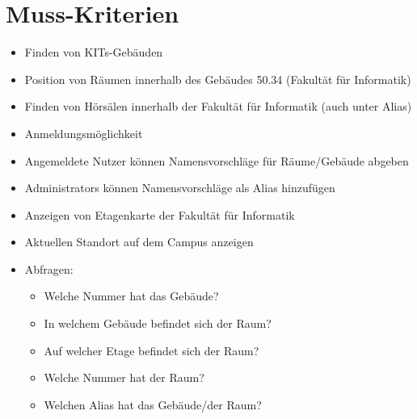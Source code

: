 \section{Muss-Kriterien}

\begin{itemize}

    \item Finden von \Glspl{KIT}-Gebäuden
    \item Position von Räumen innerhalb des Gebäudes 50.34 (Fakultät für Informatik)
    \item Finden von Hörsälen innerhalb der Fakultät für Informatik (auch unter Alias)
    \item Anmeldungsmöglichkeit
    \item Angemeldete Nutzer können Namensvorschläge für Räume/Gebäude abgeben
    \item \Glspl{Administrator} können Namensvorschläge als \Gls{Alias} hinzufügen
    \item Anzeigen von \Gls{Etagenkarte} der Fakultät für Informatik
    \item Aktuellen Standort auf dem \Gls{Campus} anzeigen
    \item Abfragen:
        \begin{itemize}
            \item Welche Nummer hat das Gebäude?
            \item In welchem Gebäude befindet sich der Raum?
            \item Auf welcher Etage befindet sich der Raum?
            \item Welche Nummer hat der Raum?
            \item Welchen \Gls{Alias} hat das Gebäude/der Raum?
        \end{itemize}

\end{itemize}
